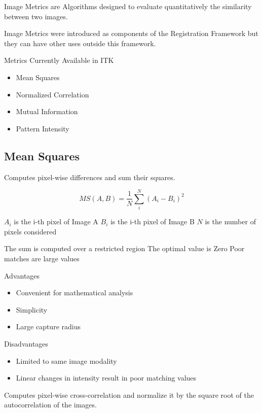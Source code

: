 Image Metrics are Algorithms designed to evaluate quantitatively the similarity
between two images.


Image Metrics were introduced as components of the Registration Framework but
they can have other uses outside this framework.


Metrics Currently Available in ITK

\begin{itemize}
\item Mean Squares
\item Normalized Correlation
\item Mutual Information
\item Pattern Intensity
\end{itemize}

\subsection{Mean Squares}


Computes pixel-wise differences and sum their squares.

\begin{equation}
MS(A,B) = \frac{1}{N} \sum_i^N \left( A_i - B_i \right)^2
\end{equation}

\begin{center}
$A_i$ is the i-th pixel of Image A 
$B_i$ is the i-th pixel of Image B
$N$ is the number of pixels considered
\end{center}

The sum is computed over a restricted region
The optimal value is  Zero
Poor matches are large values 


Advantages

\begin{itemize}
\item Convenient for mathematical analysis 
\item Simplicity
\item Large capture radius
\end{itemize}

Disadvantages
\begin{itemize}
\item Limited to same image modality
\item Linear changes in intensity result in poor matching values
\end{itemize}


Computes pixel-wise cross-correlation and normalize it
by the square root of the autocorrelation of the images.

